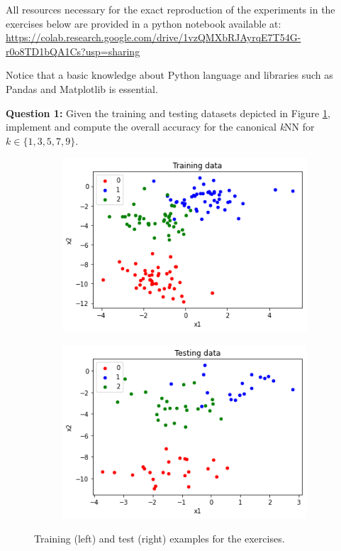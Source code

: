 All resources necessary for the exact reproduction of the experiments in the exercises below are provided in a python notebook available at: \url{https://colab.research.google.com/drive/1vzQMXbRJAyrqE7T54G-r0o8TD1bQA1Cs?usp=sharing} 

\vspace{0.2cm}

Notice that a basic knowledge about Python language and libraries such as Pandas and Matplotlib is essential.

\vspace{0.2cm}

\noindent \textbf{Question 1:}  Given the training and testing datasets depicted in Figure \ref{fig:ex1datasets}, implement and compute the overall accuracy for the canonical \textit{k}NN for $k \in \{1, 3, 5, 7, 9\}$. 

\begin{figure}
\centering
\begin{subfigure}[b]{0.5\textwidth}
  \centering
  \includegraphics[width=\textwidth]{figures/ex1_train.png}
\end{subfigure}%
\begin{subfigure}[b]{0.5\textwidth}
  \centering
  \includegraphics[width=\textwidth]{figures/ex1_test.png}
\end{subfigure}
\caption{Training (left) and test (right) examples for the exercises.}
\label{fig:ex1datasets}
\end{figure}

